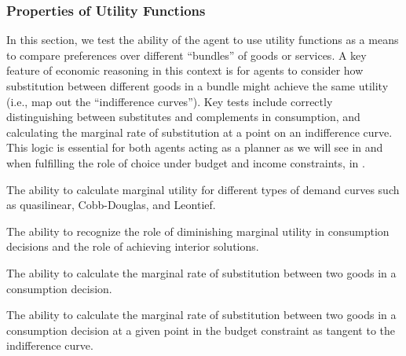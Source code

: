 
\subsubsection{Properties of Utility Functions}\label{mod:utility_properties}
In this section, we test the ability of the agent to use utility functions as a means to compare preferences over different ``bundles'' of goods or services.  A key feature of economic reasoning in this context is for agents to consider how substitution between different goods in a bundle might achieve the same utility (i.e., map out the ``indifference curves'').  Key tests include correctly distinguishing between substitutes and complements in consumption, and calculating the marginal rate of substitution at a point on an indifference curve.  This logic is essential for both agents acting as a planner as we will see in  and when fulfilling the role of choice under budget and income constraints, in .  %

\begin{el}
    {The ability to calculate marginal utility for different types of demand curves such as quasilinear, Cobb-Douglas, and Leontief.}
\end{el}

\begin{el}
    {The ability to recognize the role of diminishing marginal utility in consumption decisions and the role of achieving interior solutions.}
\end{el}

\begin{el}\label{el:mrs_utility}
    {The ability to calculate the marginal rate of substitution between two goods in a consumption decision.}
\end{el}

\begin{el}
    {The ability to calculate the marginal rate of substitution between two goods in a consumption decision at a given point in the budget constraint as tangent to the indifference curve.}
\end{el}

